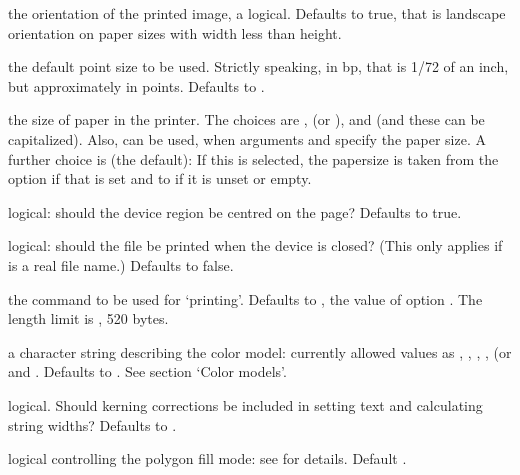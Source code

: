 \begin{Arguments}
\begin{ldescription}
\item[\code{horizontal}] the orientation of the printed image, a logical.
Defaults to true, that is landscape orientation on paper sizes
with width less than height.
\item[\code{pointsize}] the default point size to be used.  Strictly
speaking, in bp, that is 1/72 of an inch, but approximately in
points.  Defaults to .
\item[\code{paper}] the size of paper in the printer.  The choices are
,  (or ),  and
 (and these can be capitalized).
Also,  can be used, when arguments 
and  specify the paper size.  A further choice is
 (the default): If this is selected, the papersize
is taken from the option  if that is set and to
 if it is unset or empty.
\item[\code{pagecentre}] logical: should the device region be centred on the
page?  Defaults to true.
\item[\code{print.it}] logical: should the file be printed when the device is
closed?  (This only applies if  is a real file name.)
Defaults to false.
\item[\code{command}] the command to be used for `printing'.  Defaults
to , the value of option .  The
length limit is ,
520 bytes.

\item[\code{colormodel}] a character string describing the color model:
currently allowed values as , ,
, ,  (or  and
.  Defaults to .  See section
`Color models'.
\item[\code{useKerning}] logical.  Should kerning corrections be included in
setting text and calculating string widths?  Defaults to .
\item[\code{fillOddEven}] logical controlling the polygon fill mode:  see
 for details.  Default .   
\end{ldescription}
\end{Arguments}
%
